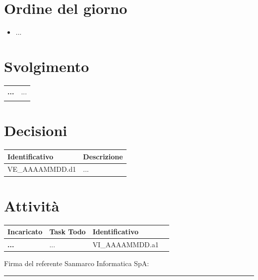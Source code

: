 \documentclass[a4paper,12pt]{article}
\begin{document}
    

    \newpage
    \tableofcontents
    \newpage

    \section{Ordine del giorno}
        \begin{itemize}
            \item ...
        \end{itemize}

    \section{Svolgimento}
        \begin{longtable}{p{5cm}|p{10cm}}
            \textbf{...} & ... \\\\
        \end{longtable}

    \section{Decisioni}
        \begin{tabularx}{\textwidth}{|l|X|}
            \hline
            \textbf{Identificativo} & \textbf{Descrizione} \\
            \hline
            VE\_AAAAMMDD.d1 & ... \\
            \hline
        \end{tabularx}

    \section{Attività}
        \begin{tabularx}{\textwidth}{|l|X|l|l|}
            \hline
            \textbf{Incaricato} & \textbf{Task Todo} & \textbf{Identificativo} \\
            \hline
            \textbf{...} & ... & VI\_AAAAMMDD.a1 \\
            \hline
        \end{tabularx}

    \bigskip
    \bigskip
    \bigskip

    \noindent Firma del referente Sanmarco Informatica SpA: \rule{6cm}{0.4pt}
\end{document}

